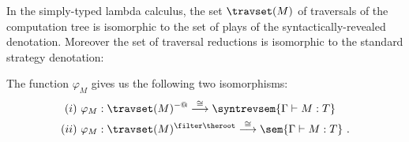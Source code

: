 In the simply-typed lambda calculus, the set $\travset(M)$ of traversals of the computation tree is isomorphic to the set of plays of the syntactically-revealed denotation. Moreover the set of traversal reductions is isomorphic to the standard strategy denotation:

\begin{theorem}
\label{thm:correspondence} The function $\varphi_M$ gives us the following two isomorphisms:
\begin{eqnarray*}
(i)~\varphi_M  &: \travset(M)^{-@} \stackrel{\cong}{\longrightarrow} \syntrevsem{\Gamma \vdash M :T} \\
(ii)~\varphi_M  &: \travset(M )^{\filter \theroot} \stackrel{\cong}{\longrightarrow} \sem{\Gamma \vdash M : T} \ .
\end{eqnarray*}
\end{theorem}

